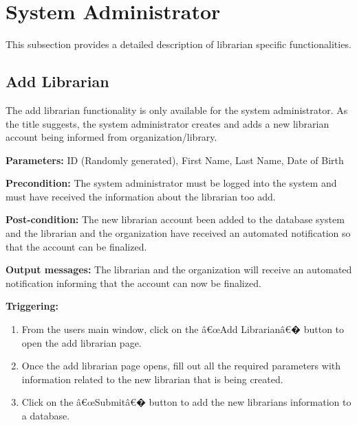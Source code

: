 \section{System Administrator}
\label{operation:System Administrator}

This subsection provides a detailed description of librarian specific
functionalities.

\subsection{Add Librarian}

The add librarian functionality is only available for the system administrator. As the title suggests, the system administrator creates and adds a new librarian account being informed from organization/library. 

\begin{description}

\item \textbf{Parameters:} ID (Randomly generated), First Name, Last Name, Date of Birth

\item \textbf{Precondition:} The system administrator must be logged into the system and must have received the information about the librarian too add. 

\item \textbf{Post-condition:} The new librarian account been added to the database system and the librarian and the organization have received an automated notification so that the account can be finalized. 

\item \textbf{Output messages:} The librarian and the organization will receive an automated notification informing that the account can now be finalized. 

\item \textbf{Triggering:}
\begin{enumerate}

\item From the users main window, click on the â€œAdd Librarianâ€� button to open the add librarian page. 

\item Once the add librarian page opens, fill out all the required parameters with information related to the new librarian that is being created. 

\item Click on the â€œSubmitâ€� button to add the new librarians
information to a database.

\end{enumerate}

\end{description}


